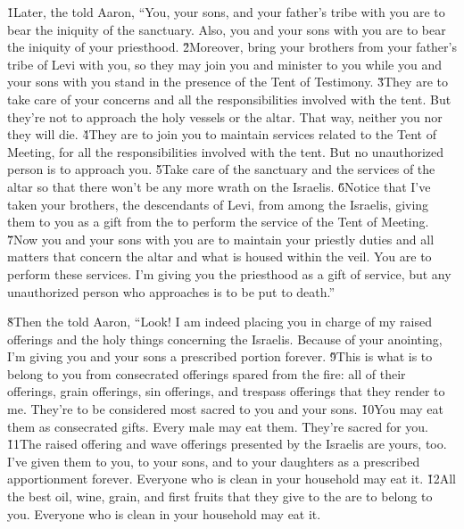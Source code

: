 \v{1}Later, the  told Aaron, ``You, your sons, and your father's tribe with you are to bear the iniquity of the sanctuary. Also, you and your sons with you are to bear the iniquity of your priesthood. \v{2}Moreover, bring your brothers from your father's tribe of Levi with you, so they may join you and minister to you while you and your sons with you stand in the presence of the Tent of Testimony. \v{3}They are to take care of your concerns and all the responsibilities involved with the tent. But they're not to approach the holy vessels or the altar. That way, neither you nor they will die. \v{4}They are to join you to maintain services related to the Tent of Meeting, for all the responsibilities involved with the tent. But no unauthorized person is to approach you. \v{5}Take care of the sanctuary and the services of the altar so that there won't be any more wrath on the Israelis. \v{6}Notice that I've taken your brothers, the descendants of Levi, from among the Israelis, giving them to you as a gift from the  to perform the service of the Tent of Meeting. \v{7}Now you and your sons with you are to maintain your priestly duties and all matters that concern the altar and what is housed within the veil. You are to perform these services. I'm giving you the priesthood as a gift of service, but any unauthorized person who approaches is to be put to death.''

\v{8}Then the  told Aaron, ``Look! I am indeed placing you in charge of my raised offerings and the holy things concerning the Israelis. Because of your anointing, I'm giving you and your sons a prescribed portion forever. \v{9}This is what is to belong to you from consecrated offerings spared from the fire: all of their offerings, grain offerings, sin offerings, and trespass offerings that they render to me. They're to be considered most sacred to you and your sons. \v{10}You may eat them as consecrated gifts. Every male may eat them. They're sacred for you. \v{11}The raised offering and wave offerings presented by the Israelis are yours, too. I've given them to you, to your sons, and to your daughters as a prescribed apportionment forever. Everyone who is clean in your household may eat it. \v{12}All the best oil, wine, grain, and first fruits that they give to the  are to belong to you. Everyone who is clean in your household may eat it.

